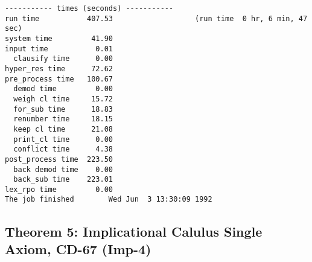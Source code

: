 {\begin{verbatim}
----------- times (seconds) -----------
run time           407.53                   (run time  0 hr, 6 min, 47 sec)
system time         41.90
input time           0.01
  clausify time      0.00
hyper_res time      72.62
pre_process time   100.67
  demod time         0.00
  weigh cl time     15.72
  for_sub time      18.83
  renumber time     18.15
  keep cl time      21.08
  print_cl time      0.00
  conflict time      4.38
post_process time  223.50
  back demod time    0.00
  back_sub time    223.01
lex_rpo time         0.00
The job finished        Wed Jun  3 13:30:09 1992
\end{verbatim} }
\subsection{Theorem 5: Implicational Calulus Single Axiom, CD-67 (Imp-4)}
